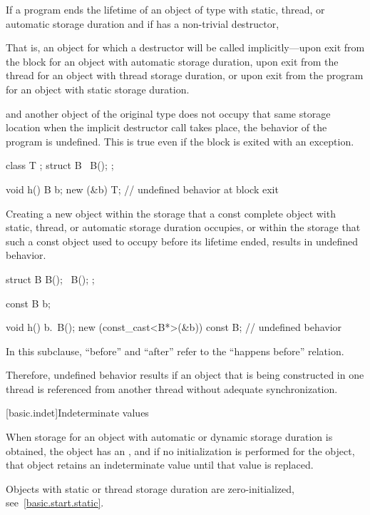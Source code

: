 \pnum
If a program ends the lifetime of an object of type  with
static, thread,
or automatic
storage duration and if  has a non-trivial destructor,
\begin{footnote}
That
is, an object for which a destructor will be called
implicitly---upon exit from the block for an object with
automatic storage duration, upon exit from the thread for an object with
thread storage duration, or upon exit from the program for an object
with static storage duration.
\end{footnote}
and another object of the original type does not occupy
that same storage location when the implicit destructor call takes
place, the behavior of the program is undefined. This is true
even if the block is exited with an exception.
\begin{example}
\begin{codeblock}
class T { };
struct B {
   ~B();
};

void h() {
   B b;
   new (&b) T;
}                               // undefined behavior at block exit
\end{codeblock}
\end{example}

\pnum
Creating a new object within the storage that a const complete
object with static, thread, or automatic storage duration occupies,
or within the storage that such a const object used to occupy before
its lifetime ended, results in undefined behavior.
\begin{example}
\begin{codeblock}
struct B {
  B();
  ~B();
};

const B b;

void h() {
  b.~B();
  new (const_cast<B*>(&b)) const B;     // undefined behavior
}
\end{codeblock}
\end{example}

\pnum
In this subclause, ``before'' and ``after'' refer to the ``happens before''
relation.
\begin{note}
Therefore, undefined behavior results
if an object that is being constructed in one thread is referenced from another
thread without adequate synchronization.
\end{note}

[basic.indet]{Indeterminate values}

\pnum
{}%
%
When storage for an object with automatic or dynamic storage duration
is obtained, the object has an , and if
no initialization is performed for the object, that object retains an
indeterminate value until that value is replaced.
\begin{note}
Objects with static or thread storage duration are zero-initialized,
see~\ref{basic.start.static}.
\end{note}

